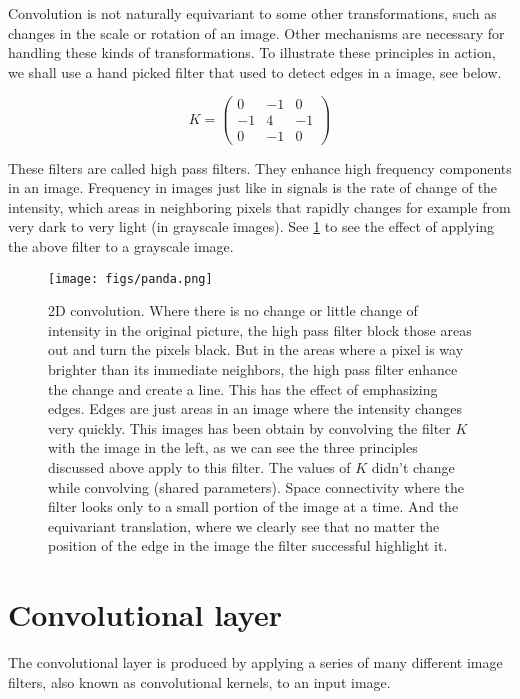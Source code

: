 Convolution is not naturally equivariant to some other transformations, such as changes in the scale or rotation of an image. Other
mechanisms are necessary for handling these kinds of transformations. To illustrate these principles in action, we shall use a hand picked
filter that used to detect edges in a image, see below.

$$
K = \begin{pmatrix}
0  & -1  &  0 \\
-1 &  4  & -1 \\
0  & -1  &  0
\end{pmatrix}
$$

These filters are called high pass filters. They enhance high frequency components in an image. Frequency in images just like in signals is the rate
of change of the intensity, which areas in neighboring pixels that rapidly changes for example from very dark to very light (in grayscale images).
See \cref{fig:filter} to see the effect of applying the above filter to a grayscale image.

\begin{figure}[H]
  \centering
  \texttt{[image: figs/panda.png]}
  \caption[2D convolution]{2D convolution. Where there is no change or little change of intensity in the original picture, the high pass filter
  block those areas out and turn the pixels black. But in the areas where a pixel is way brighter than its immediate neighbors, the high pass filter
  enhance the change and create a line. This has the effect of emphasizing edges. Edges are just areas in an image where the intensity changes very
  quickly. This images has been obtain by convolving the filter $K$ with the image in the left, as we can see the three principles discussed above
  apply to this filter. The values of $K$ didn't change while convolving (shared parameters). Space connectivity where
  the filter looks only to a small portion of the image at a time. And the equivariant translation, where we clearly see that no matter the position
  of the edge in the image the filter successful highlight it.}\label{fig:filter}
\end{figure}

\section{Convolutional layer}

The convolutional layer is produced by applying a series of many different image filters, also known as convolutional kernels, to an input image.

